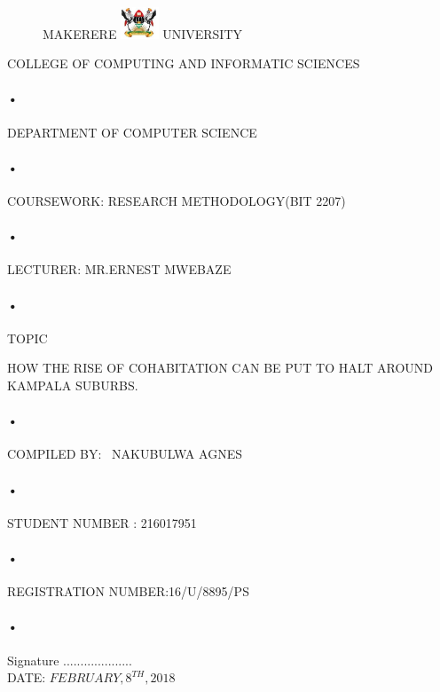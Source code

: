\documentclass[12pt]{article}
\begin{document}
\begin{titlepage}
 \begin{figure}[h]
  \centerline{\small MAKERERE 
  \includegraphics[width=0.1\textwidth]{muk_log} UNIVERSITY}
\end{figure}
\centerline{COLLEGE OF COMPUTING AND INFORMATIC SCIENCES}
\paragraph{•}
\centerline{DEPARTMENT OF COMPUTER SCIENCE\\}
\paragraph{•}

\centerline{COURSEWORK: RESEARCH METHODOLOGY(BIT 2207)\\}
\paragraph{•}

\centerline{LECTURER: MR.ERNEST MWEBAZE}
\paragraph{•}

\centerline{TOPIC\\}HOW THE RISE OF COHABITATION CAN BE PUT TO HALT AROUND KAMPALA SUBURBS. \\
\paragraph{•}
\centerline{COMPILED BY: \
 NAKUBULWA AGNES}
 \paragraph{•}
\centerline{STUDENT NUMBER : 216017951}
\paragraph{•}
\centerline{REGISTRATION NUMBER:16/U/8895/PS}
\paragraph{•}
\begin{flushright}
    Signature ....................\\
    DATE: $ FEBRUARY,8^{TH},2018$
\end{flushright}

\end{titlepage}
\tableofcontents
\newpage
{}
\end{document}
